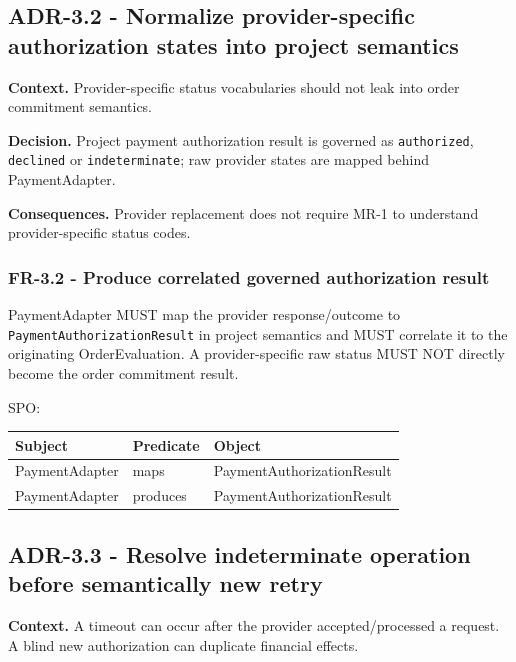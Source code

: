 \documentclass[
  10pt,
]{article}
\begin{document}
\subsection{ADR-3.2 - Normalize provider-specific authorization states
into project
semantics}\label{adr-32---normalize-provider-specific-authorization-states-into-project-semantics}

\textbf{Context.} Provider-specific status vocabularies should not leak
into order commitment semantics.

\textbf{Decision.} Project payment authorization result is governed as
\texttt{authorized}, \texttt{declined} or \texttt{indeterminate}; raw
provider states are mapped behind PaymentAdapter.

\textbf{Consequences.} Provider replacement does not require MR-1 to
understand provider-specific status codes.

\subsubsection{FR-3.2 - Produce correlated governed authorization
result}\label{fr-32---produce-correlated-governed-authorization-result}

PaymentAdapter MUST map the provider response/outcome to
\texttt{PaymentAuthorizationResult} in project semantics and MUST
correlate it to the originating OrderEvaluation. A provider-specific raw
status MUST NOT directly become the order commitment result.

SPO:

\begin{longtable}[]{@{}lll@{}}
\toprule\noalign{}
Subject & Predicate & Object \\
\midrule\noalign{}
\endhead
\bottomrule\noalign{}
\endlastfoot
PaymentAdapter & maps & PaymentAuthorizationResult \\
PaymentAdapter & produces & PaymentAuthorizationResult \\
\end{longtable}

\subsection{ADR-3.3 - Resolve indeterminate operation before
semantically new
retry}\label{adr-33---resolve-indeterminate-operation-before-semantically-new-retry}

\textbf{Context.} A timeout can occur after the provider
accepted/processed a request. A blind new authorization can duplicate
financial effects.
\end{document}
